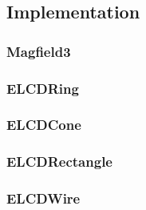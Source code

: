 	  \subsection{Implementation}
	    \subsubsection{Magfield3}
	    \subsubsection{ELCDRing}
	    \subsubsection{ELCDCone}
	    \subsubsection{ELCDRectangle}
	    \subsubsection{ELCDWire}

